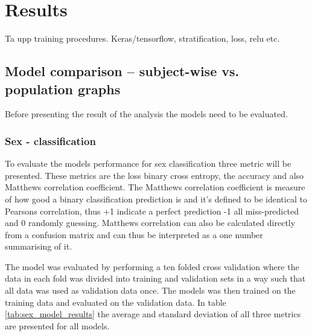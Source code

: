 \chapter{Results}

Ta upp training procedures. Keras/tensorflow, stratification, loss, relu etc.

\section{Model comparison -- subject-wise vs. population graphs}
Before presenting the result of the analysis the models need to be evaluated. 

\subsection{Sex - classification}
To evaluate the models performance for sex classification three metric will be presented. These metrics are the loss binary cross entropy, the accuracy and also Matthews correlation coefficient. 
The Matthews correlation coefficient is measure of how good a binary classification prediction is and it's defined to be identical to Pearsons correlation, thus +1 indicate a perfect prediction -1 all miss-predicted and 0 randomly guessing. Matthews correlation can also be calculated directly from a confusion matrix and can thus be interpreted as a one number summarising of it. 


The model was evaluated by performing a ten folded cross validation where the data in each fold was divided into training and validation sets in a way such that all data was used as validation data once. The models was then trained on the training data and evaluated on the validation data.
In table \ref{tab:sex_model_results} the average and standard deviation of all three metrics are presented for all models. 



